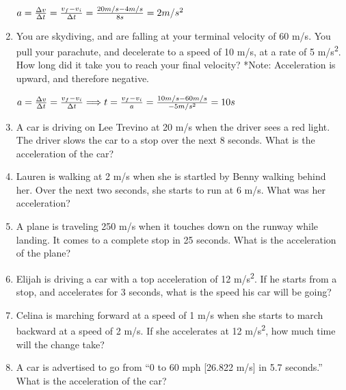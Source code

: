 \documentclass[letterpaper, 12pt]{article}
\begin{document}
\begin{enumerate}
	
	
	\color{red}
	\begin{center} $ a = \frac{\Delta v}{\Delta t } = \frac{v_f - v_i}{\Delta t} =  \frac{20 m/s - 4 m/s}{8s} = 2 m/s^2
		\vspace{0.15in} $
	\end{center}	
	\color{black}
	

\item You are skydiving, and are falling at your terminal velocity of 60 m/s.  You pull your parachute, and decelerate to a speed of 10 m/s, at a rate of 5 m/s\textsuperscript{2}.  How long did it take you to reach your final velocity? \color{red} *Note: Acceleration is upward, and therefore negative.



\begin{center} $ a = \frac{\Delta v}{\Delta t } = \frac{v_f - v_i}{\Delta t} \Longrightarrow t = \frac{v_f-v_i}{a} = \frac{10m/s-60m/s}{-5m/s^2} = 10s
	\vspace{0.15in} $
\end{center}	
\color{black}




\item A car is driving on Lee Trevino at 20 m/s when the driver sees a red light.  The driver slows the car to a stop over the next 8 seconds.  What is the acceleration of the car?
\vspace{1.5in}
\item Lauren is walking at 2 m/s when she is startled by Benny walking behind her. Over the next two seconds, she starts to run at 6 m/s. What was her acceleration?
\vspace{1in}
\item A plane is traveling 250 m/s when it touches down on the runway while landing.  It comes to a complete stop in 25 seconds.  What is the acceleration of the plane?
\vspace{1in}
\item Elijah is driving a car with a top acceleration of 12 m/s\textsuperscript{2}.  If he starts from a stop, and accelerates for 3 seconds, what is the speed his car will be going?
\vspace{1in}
\item Celina is marching forward at a speed of 1 m/s when she starts to march backward at a speed of 2 m/s.  If she accelerates at 12 m/s\textsuperscript{2}, how much time will the change take?
\vspace{1in}
\item A car is advertised to go from “0 to 60 mph [26.822 m/s] in 5.7 seconds.”  What is the acceleration of the car?







	
\end{enumerate}
 
\end{document}
